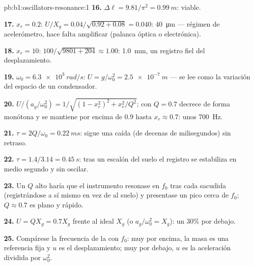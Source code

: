 \begin{solution}{pb:b1:oscillators-resonance:1}
\textbf{16.} $\Delta\ell = 9.81/\pi^2 = \qty{0.99}{m}$: viable.

\textbf{17.} $x_r = 0.2$: $U/X_g = 0.04/\sqrt{0.92 + 0.08} = 0.040$:
\qty{40}{\micro m} --- régimen de acelerómetro, hace falta amplificar
(palanca óptica o electrónica).

\textbf{18.} $x_r = 10$: $100/\sqrt{9801 + 204} \approx 1.00$: \qty{1.0}{mm},
un registro fiel del desplazamiento.

\textbf{19.} $\omega_0 = \qty{6.3e3}{rad/s}$: $U = g/\omega_0^2 = \qty{2.5e-7}{m}$
--- se lee como la variación del espacio de un condensador.

\textbf{20.} $U/(a_g/\omega_0^2) = 1/\sqrt{(1 - x_r^2)^2 + x_r^2/Q^2}$; con
$Q = 0.7$ decrece de forma monótona y se mantiene por encima de $0.9$
hasta $x_r \approx 0.7$: unos \qty{700}{Hz}.

\textbf{21.} $\tau = 2Q/\omega_0 = \qty{0.22}{ms}$: sigue una caída (de
decenas de milisegundos) sin retraso.

\textbf{22.} $\tau = 1.4/3.14 = \qty{0.45}{s}$: tras un escalón del suelo
el registro se estabiliza en medio segundo y sin oscilar.

\textbf{23.} Un $Q$ alto haría que el instrumento resonase en $f_0$ tras
cada sacudida (registrándose a sí mismo en vez de al suelo) y presentase
un pico cerca de $f_0$; $Q \approx 0.7$ es plano y rápido.

\textbf{24.} $U = QX_g = 0.7X_g$ frente al ideal $X_g$ (o $a_g/\omega_0^2
= X_g$): un $30\%$ por debajo.

\textbf{25.} Compárese la frecuencia de la  con $f_0$: muy por
encima, la masa es una referencia fija y $u$ es el desplazamiento; muy por
debajo, $u$ es la aceleración dividida por $\omega_0^2$.
\end{solution}
